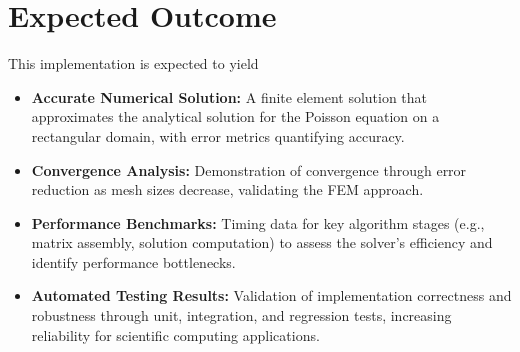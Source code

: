\documentclass{article}
\begin{document}
\section{Expected Outcome}
This implementation is expected to yield
\begin{itemize}
    \item \textbf{Accurate Numerical Solution:} A finite element solution that approximates the analytical solution for the Poisson equation on a rectangular domain, with error metrics quantifying accuracy.

    \item \textbf{Convergence Analysis:} Demonstration of convergence through error reduction as mesh sizes decrease, validating the FEM approach.

    \item \textbf{Performance Benchmarks:} Timing data for key algorithm stages (e.g., matrix assembly, solution computation) to assess the solver's efficiency and identify performance bottlenecks.

    \item \textbf{Automated Testing Results:} Validation of implementation correctness and robustness through unit, integration, and regression tests, increasing reliability for scientific computing applications.

\end{itemize}


%
%
\end{document}
